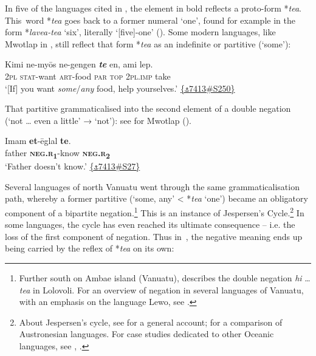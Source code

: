 \documentclass[output=paper,colorlinks,citecolor=brown,draft]{langscibook}
\begin{document}
In five of the languages cited in , the element in bold reflects a proto-form *\textit{tea}. This~word *\textit{tea} goes back to a former numeral ‘one’, found for example in the form *\textit{lavea-tea} ‘six’, literally ‘[five]-one’ (\citealt[496]{François2005a}). Some modern languages, like Mwotlap in , still reflect that form *\textit{tea} as an indefinite or partitive (‘some’): 

\ea\label{ex:dor:par} 
    \gll  Kimi ne-myōs ne-gengen \textbf{\textit{te}} en, ami lep.\\ 
          \textsc{2pl} \textsc{stat-}want \textsc{art}-food \textsc{par} \textsc{top} \textsc{2pl.imp} take\\
    \glt ‘[If] you want \textit{some}/\textit{any} food, help yourselves.’ \quad  \href{https://doi.org/10.24397/pangloss-0007413#S250}{\{\texttt{⚓}7413\#S250\}}
\z 

That partitive grammaticalised into the second element of a double negation (‘not … even a little’ → ‘not’): see  for Mwotlap (\citealt[317]{François2003}).

\ea\label{ex:dor:jespersen2} 
    \gll  Imam \textbf{et}-ēglal \textbf{te}. \\ 
          father \textbf{\textsc{neg.r}\textsubscript{1}}-know \textbf{\textsc{neg.r}\textsubscript{2}}\\
    \glt ‘Father doesn’t know.’ \quad \href{https://doi.org/10.24397/pangloss-0007413#S27}{\{\texttt{⚓}7413\#S27\}}
\z 

Several languages of north Vanuatu went through the same grammaticalisation path, whereby a former partitive (‘some, any’ < *\textit{tea} ‘one’) became an obligatory component of a bipartite negation.\footnote{Further south on Ambae island (Vanuatu), \citet[260]{Hyslop2001} describes the double negation \textit{hi} … \textit{tea} in Lolovoli. For an overview of negation in several languages of Vanuatu, with an emphasis on the language Lewo, see \citet[89]{Early1994}.} 
This is an instance of Jespersen’s \mbox{Cycle}.\footnote{About Jespersen’s cycle, see \citet{Auwera2009} for a general account; \citet{VossenAuwera2014} for a comparison of Austronesian languages. For case studies dedicated to other Oceanic languages, see \citet{Barbour2015}, \citet{RoversiNaess2019}.} In some languages, the cycle has even reached its ultimate consequence – i.e. the loss of the first component of negation. Thus in~, the negative meaning ends up being carried by the reflex of *\textit{tea} on its own:
\end{document}
